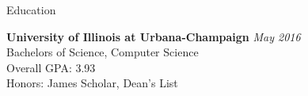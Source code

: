 \documentclass{resume} %
\begin{document}

\begin{rSection}{Education}

{\bf University of Illinois at Urbana-Champaign} \hfill {\em May 2016} \\ 
Bachelors of Science, Computer Science \\
Overall GPA: 3.93 \\
Honors: James Scholar, Dean's List
\end{rSection}

\end{document}
